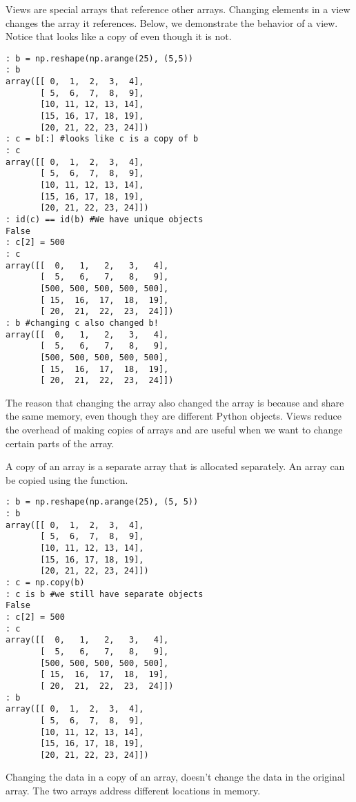 Views are special arrays that reference other arrays.
Changing elements in a view changes the array it references.
Below, we demonstrate the behavior of a view.
Notice that  looks like a copy of  even though it is not.
\begin{lstlisting}
: b = np.reshape(np.arange(25), (5,5))
: b
array([[ 0,  1,  2,  3,  4],
       [ 5,  6,  7,  8,  9],
       [10, 11, 12, 13, 14],
       [15, 16, 17, 18, 19],
       [20, 21, 22, 23, 24]])
: c = b[:] #looks like c is a copy of b
: c
array([[ 0,  1,  2,  3,  4],
       [ 5,  6,  7,  8,  9],
       [10, 11, 12, 13, 14],
       [15, 16, 17, 18, 19],
       [20, 21, 22, 23, 24]])
: id(c) == id(b) #We have unique objects
False
: c[2] = 500
: c
array([[  0,   1,   2,   3,   4],
       [  5,   6,   7,   8,   9],
       [500, 500, 500, 500, 500],
       [ 15,  16,  17,  18,  19],
       [ 20,  21,  22,  23,  24]])
: b #changing c also changed b!
array([[  0,   1,   2,   3,   4],
       [  5,   6,   7,   8,   9],
       [500, 500, 500, 500, 500],
       [ 15,  16,  17,  18,  19],
       [ 20,  21,  22,  23,  24]])
\end{lstlisting}
The reason that changing the array  also changed the array  is because  and  share the same memory, even though they are different Python objects.
Views reduce the overhead of making copies of arrays and are useful when we want to change certain parts of the array.

A copy of an array is a separate array that is allocated separately.
An array can be copied using the  function.
\begin{lstlisting}
: b = np.reshape(np.arange(25), (5, 5))
: b
array([[ 0,  1,  2,  3,  4],
       [ 5,  6,  7,  8,  9],
       [10, 11, 12, 13, 14],
       [15, 16, 17, 18, 19],
       [20, 21, 22, 23, 24]])
: c = np.copy(b)
: c is b #we still have separate objects
False
: c[2] = 500
: c
array([[  0,   1,   2,   3,   4],
       [  5,   6,   7,   8,   9],
       [500, 500, 500, 500, 500],
       [ 15,  16,  17,  18,  19],
       [ 20,  21,  22,  23,  24]])
: b
array([[ 0,  1,  2,  3,  4],
       [ 5,  6,  7,  8,  9],
       [10, 11, 12, 13, 14],
       [15, 16, 17, 18, 19],
       [20, 21, 22, 23, 24]])
\end{lstlisting}
Changing the data in a copy of an array, doesn't change the data in the original array.
The two arrays address different locations in memory.

